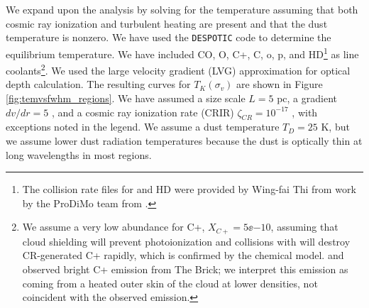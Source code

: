 We expand upon the \citet{Ao2013a} analysis by solving for the temperature
assuming that both cosmic ray ionization and turbulent heating are present and
that the dust temperature is nonzero.  We have used the \texttt{DESPOTIC} code
\citep{Krumholz2014c} to determine the equilibrium temperature.  We have
included CO, O, C+, C, o\hh, p\hh, and HD\footnote{The collision rate files for
\hh and HD were provided by Wing-fai Thi from work by the ProDiMo team from
\citet{Le-Bourlot1999a,Wrathmall2007a,Flower2000a,Wolniewicz1998a}.} as line
coolants\footnote{We assume a
very low abundance for C+, $X_{C+}=5\ee{-10}$, assuming that cloud shielding
will prevent photoionization and collisions with \hh will destroy CR-generated
C+ rapidly, which is confirmed by the \citet{Nelson1999a} chemical model.
\citet{Lis1998a} and \citet{Lis1999a} observed bright C+ emission from The
Brick; we interpret this emission as coming from a heated outer skin of the
cloud at lower densities, not coincident with the observed \formaldehyde
emission.}.  We used the large velocity gradient
(LVG) approximation for optical depth calculation.  The resulting curves for
$T_K(\sigma_v)$ are shown in Figure \ref{fig:temvsfwhm_regions}.  We have
assumed a size scale $L=5$ pc, a gradient $dv/dr = 5$ \kms \perpc, and a cosmic
ray ionization rate (CRIR) $\zeta_{CR}=10^{-17}$ \pers, with exceptions noted
in the legend.  We assume a dust temperature $T_D=25$ K, but we assume lower
dust radiation temperatures because the dust is optically thin at long
wavelengths in most regions.


